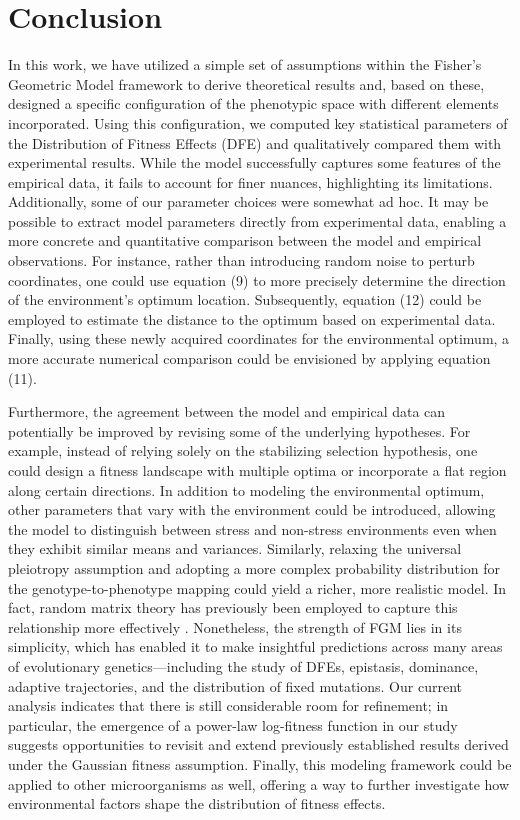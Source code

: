 \documentclass[11pt]{article}
\begin{document}
\section{Conclusion}
In this work, we have utilized a simple set of assumptions within the Fisher’s Geometric Model  framework to derive theoretical results and, based on these, designed a specific configuration of the phenotypic space with different elements incorporated. Using this configuration, we computed key statistical parameters of the Distribution of Fitness Effects (DFE) and qualitatively compared them with experimental results. While the model successfully captures some features of the empirical data, it fails to account for finer nuances, highlighting its limitations. Additionally, some of our parameter choices were somewhat ad hoc. It may be possible to extract model parameters directly from experimental data, enabling a more concrete and quantitative comparison between the model and empirical observations. For instance, rather than introducing random noise to perturb coordinates, one could use equation (9) to more precisely determine the direction of the environment’s optimum location. Subsequently, equation (12) could be employed to estimate the distance to the optimum based on experimental data. Finally, using these newly acquired coordinates for the environmental optimum, a more accurate numerical comparison could be envisioned by applying equation (11). 

Furthermore, the agreement between the model and empirical data can potentially be improved by revising some of the underlying hypotheses. For example, instead of relying solely on the stabilizing selection hypothesis, one could design a fitness landscape with multiple optima or incorporate a flat region along certain directions. In addition to modeling the environmental optimum, other parameters that vary with the environment could be introduced, allowing the model to distinguish between stress and non-stress environments even when they exhibit similar means and variances. Similarly, relaxing the universal pleiotropy assumption and adopting a more complex probability distribution for the genotype-to-phenotype mapping could yield a richer, more realistic model. In fact, random matrix theory has previously been employed to capture this relationship more effectively \cite{martin2006general}. Nonetheless, the strength of FGM lies in its simplicity, which has enabled it to make insightful predictions across many areas of evolutionary genetics—including the study of DFEs, epistasis, dominance, adaptive trajectories, and the distribution of fixed mutations. Our current analysis indicates that there is still considerable room for refinement; in particular, the emergence of a power-law log-fitness function in our study suggests opportunities to revisit and extend previously established results derived under the Gaussian fitness assumption. Finally, this modeling framework could be applied to other microorganisms as well, offering a way to further investigate how environmental factors shape the distribution of fitness effects.
  
\end{document}
